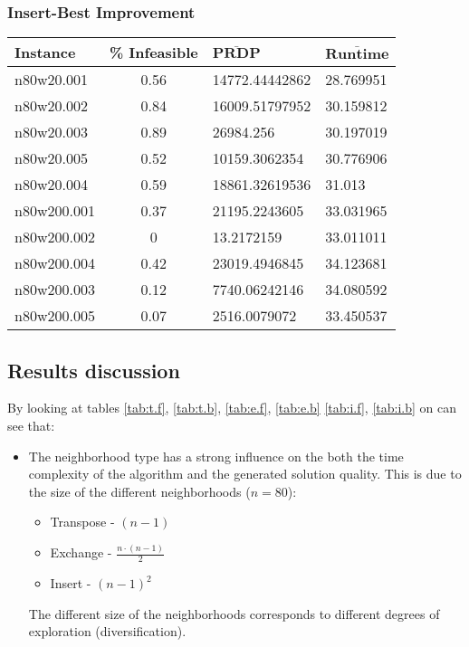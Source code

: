 \begin{homeworkProblem}
\subsubsection{Insert-Best Improvement}
\begin{center}
\begin{tabular}{|l|c|l|l|}
\hline
\textbf{Instance}& \textbf{\% Infeasible} & $\mathbf{\bar{PRDP}}$ &$\mathbf{\bar{Runtime}}$\\
\hline
n80w20.001&0.56&14772.44442862&28.769951\\
\hline
n80w20.002&0.84&16009.51797952&30.159812\\
\hline
n80w20.003&0.89&26984.256&30.197019\\
\hline
n80w20.005&0.52&10159.3062354&30.776906\\
\hline
n80w20.004&0.59&18861.32619536&31.013\\
\hline
n80w200.001&0.37&21195.2243605&33.031965\\
\hline
n80w200.002&0&13.2172159&33.011011\\
\hline
n80w200.004&0.42&23019.4946845&34.123681\\
\hline
n80w200.003&0.12&7740.06242146&34.080592\\
\hline
n80w200.005&0.07&2516.0079072&33.450537\\
\hline
\end{tabular}
\label{tab:i.b}
\end{center}

\subsection{Results discussion}
By looking at tables \ref{tab:t.f}, \ref{tab:t.b}, \ref{tab:e.f}, \ref{tab:e.b} \ref{tab:i.f}, \ref{tab:i.b} on can see that:
\begin{itemize}
\item The neighborhood type has a strong influence on the both the time complexity of the algorithm and the generated solution quality. This is due to the size of the different neighborhoods ($n=80$):
      \begin{itemize}
        \item Transpose - $(n-1)$
        \item Exchange - $\frac{n\cdot(n-1)}{2}$
        \item Insert - $(n-1)^2$
      \end{itemize}
The different size of the neighborhoods corresponds to different degrees of exploration (diversification).
      

\end{itemize}
\end{homeworkProblem}
